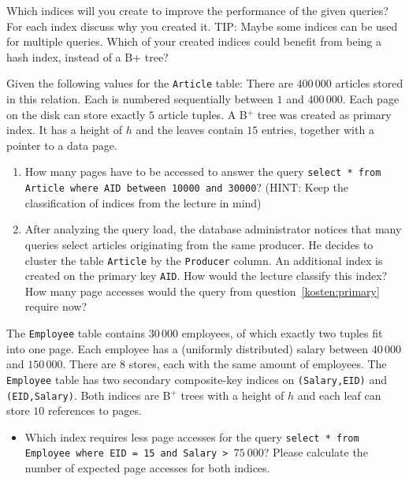 Which indices will you create to improve the performance of the given queries?
For each index discuss why you created it. 
TIP: Maybe some indices can be used for multiple queries.
Which of your created indices could benefit from being a hash index, instead of a B+ tree? 


\newpage
{}
Given the following values for the {\tt Article} table:
There are $400\,000$  articles stored in this relation. Each is numbered sequentially between $1$ and $400\,000$. 
Each page on the disk can store exactly $5$ article tuples.
A B$^+$ tree was created as primary index. It has a height of $h$ and the leaves contain $15$ entries, together with a pointer to a data page.

\begin{enumerate}
  \setlength\itemsep{.3em}
  \item\label{kosten:primary}
    How many pages have to be accessed to answer the query {\tt select * from Article where AID between 10000 and 30000}?
    (HINT: Keep the classification of indices from the lecture in mind)
    

  \item
  After analyzing the query load, the database administrator notices that many queries select articles originating from the same producer.
  He decides to cluster the table {\tt Article} by the {\tt Producer} column. 
  An additional index is created on the primary key {\tt AID}.
  How would the lecture classify this index?
  How many page accesses would the query from question~\ref{kosten:primary} require now?
    
\end{enumerate}



The {\tt Employee} table contains $30\,000$ employees, of which exactly two tuples fit into one page.
Each employee has a (uniformly distributed) salary between $40\,000$ and $150\,000$.
There are $8$ stores, each with the same amount of employees.
The {\tt Employee} table has two secondary composite-key indices on {\tt (Salary,EID)} and {\tt (EID,Salary)}.
Both indices are B$^+$ trees with a height of $h$ and each leaf can store $10$ references to pages.

\begin{itemize}
  \setlength\itemsep{.3em}
  \item
    Which index requires less page accesses for the query {\tt select * from Employee where EID = 15 and Salary > $75\ 000$}?
    Please calculate the number of expected page accesses for both indices.
  
\end{itemize}

